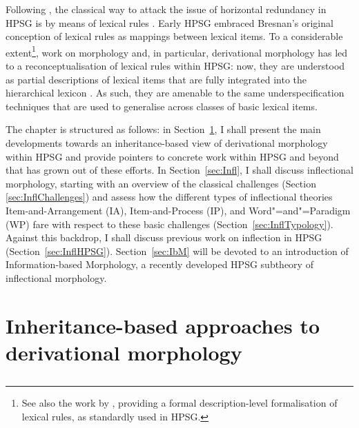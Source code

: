 \documentclass[output=paper
 	        ,biblatex
                ,babelshorthands
                ,newtxmath
                ,draftmode
                ,colorlinks, citecolor=brown
]{langscibook}
\begin{document}
Following \citet{Bresnan82}, the classical way to attack the issue of
horizontal redundancy in HPSG is by means of lexical rules
\citep{Flickinger87}. Early HPSG embraced Bresnan's original
conception of lexical rules as mappings between lexical items. To a
considerable extent\footnote{See also the work by
  \citet{Meurers02}, providing a formal
  description-level formalisation of lexical rules, as standardly used
  in HPSG.}, work on morphology and, in particular, derivational
morphology has led to a reconceptualisation of lexical rules within
HPSG: now, they are understood as partial descriptions of lexical
items that are fully integrated into the hierarchical lexicon
\citep{Koenig99}. As such, they are
amenable to the same underspecification techniques that are used to
generalise across classes of basic lexical items.



\medskip

The chapter is structured as follows: in Section~\ref{sec:Deriv}, I
shall present the main developments towards an inheritance-based view
of derivational morphology within HPSG and provide pointers to
concrete work within HPSG and beyond that has grown out of these
efforts. In Section~\ref{sec:Infl}, I shall discuss inflectional
morphology, starting with an overview of the classical challenges
(Section \ref{sec:InflChallenges}) and assess how the different types
of inflectional theories \emdash Item-and-Arrangement (IA),
Item-and-Process (IP), and Word"=and"=Paradigm (WP) \emdash fare with
respect to these basic challenges
(Section~\ref{sec:InflTypology}). Against this backdrop, I shall
discuss previous work on inflection in HPSG
(Section~\ref{sec:InflHPSG}). Section~\ref{sec:IbM} will be devoted to
an introduction of Information-based Morphology, a recently developed
HPSG subtheory of inflectional morphology.



\section{Inheritance-based approaches to derivational morphology}
\label{sec:Deriv}\label{sec:derivational-morphology}

\subsection{\texorpdfstring{\citet{Krieger:Nerbonne:93}}{Krieger \& Nerbonne (1993)}}
\end{document}
